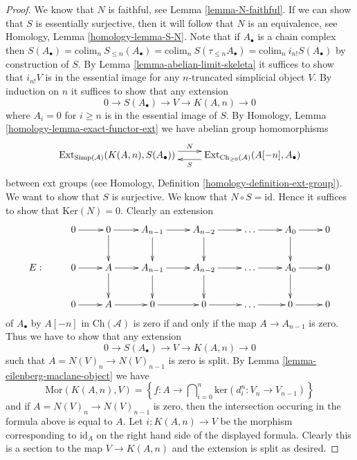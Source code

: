 \begin{proof}
\medskip\noindent
We know that $N$ is faithful, see Lemma \ref{lemma-N-faithful}.
If we can show that $S$ is essentially surjective, then
it will follow that $N$ is an equivalence,
see Homology, Lemma \ref{homology-lemma-S-N}.
Note that if $A_\bullet$ is a chain complex
then $S(A_\bullet) = \text{colim}_n\ S_{\leq n}(A_\bullet)
= \text{colim}_n\ S(\tau_{\leq n} A_\bullet) =
\text{colim}_n\ i_{n!} S(A_\bullet)$ by construction
of $S$.
By Lemma \ref{lemma-abelian-limit-skeleta} it suffices
to show that $i_{n!} V$ is in the essential image
for any $n$-truncated simplicial object $V$.
By induction on $n$ it suffices to show
that any extension
$$
0 \to S(A_\bullet) \to V \to K(A, n) \to 0
$$
where $A_i = 0$ for $i \geq n$ is in the essential
image of $S$. By Homology, Lemma \ref{homology-lemma-exact-functor-ext}
we have abelian group homomorphisms
$$
\xymatrix{
\text{Ext}_{\text{Simp}(\mathcal{A})}(K(A, n), S(A_\bullet))
\ar@<1ex>[r]^-{N} &
\text{Ext}_{\text{Ch}_{\geq 0}(\mathcal{A})}(A[-n], A_\bullet)
\ar@<1ex>[l]^-{S}
}
$$
between ext groups (see
Homology, Definition \ref{homology-definition-ext-group}).
We want to show that $S$ is surjective. We know that
$N \circ S = \text{id}$. Hence it suffices to show that
$\text{Ker}(N) = 0$. Clearly an extension
$$
\xymatrix{
&
0 \ar[r] &
0 \ar[r] \ar[d] &
A_{n - 1} \ar[r] \ar[d] &
A_{n - 2} \ar[r] \ar[d] &
\ldots \ar[r] &
A_0 \ar[r] \ar[d] &
0 \\
E : &
0 \ar[r] &
A \ar[r] \ar[d] &
A_{n - 1} \ar[r] \ar[d] &
A_{n - 2} \ar[r] \ar[d] &
\ldots \ar[r] &
A_0 \ar[r] \ar[d] &
0 \\
&
0 \ar[r] &
A \ar[r] &
0 \ar[r] &
0 \ar[r] &
\ldots \ar[r] &
0 \ar[r] &
0
}
$$
of $A_\bullet$ by $A[-n]$ in $\text{Ch}(\mathcal{A})$ is
zero if and only if the map $A \to A_{n - 1}$ is zero.
Thus we have to show that any extension
$$
0 \to S(A_\bullet) \to V \to K(A, n) \to 0
$$
such that $A = N(V)_n \to N(V)_{n - 1}$ is zero is split.
By Lemma \ref{lemma-eilenberg-maclane-object} we have
$$
\text{Mor}(K(A, n), V)
=
\left\{
f : A
\to
\bigcap\nolimits_{i = 0}^n \text{ker}(d^n_i : V_n \to V_{n - 1})
\right\}
$$
and if $A = N(V)_n \to N(V)_{n - 1}$ is zero, then
the intersection occuring in the formula above is
equal to $A$. Let $i : K(A, n) \to V$ be the morphism
corresponding to $\text{id}_A$ on the right hand side
of the displayed formula. Clearly this is a section
to the map $V \to K(A, n)$ and the extension is split
as desired.
\end{proof}







